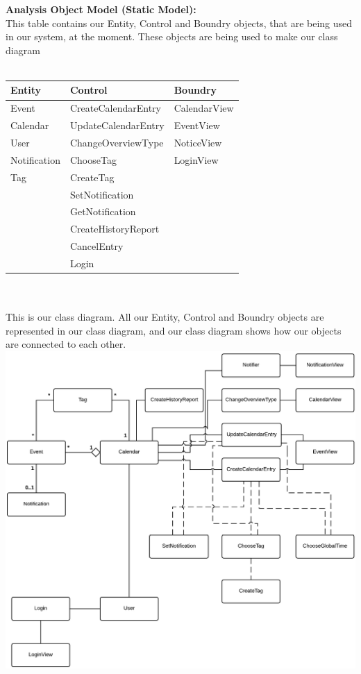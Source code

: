 \textbf{Analysis Object Model (Static Model):}\\
This table contains our Entity, Control and Boundry objects, that are being used in our system, at the moment.
These objects are being used to make our class diagram\\
\\
\begin{tabular}{l | l | l}

Entity    	& Control 			& Boundry 		\\
\toprule
Event     	& CreateCalendarEntry	& CalendarView	\\
Calendar	& UpdateCalendarEntry	& EventView 		\\
User		& ChangeOverviewType	& NoticeView		\\
Notification	& ChooseTag			& LoginView		\\
Tag		& CreateTag			&			\\
		& SetNotification		&			\\
		& GetNotification		&			\\		
		& CreateHistoryReport	&			\\
		& CancelEntry		&			\\
		& Login			&			\\		
		
\bottomrule
\end{tabular}\\
\\

This is our class diagram. All our Entity, Control and Boundry objects are represented in our class diagram, 
and our class diagram shows how our objects are connected to each other.\\
\includegraphics[scale=0.4]{UMLClassDiagram}